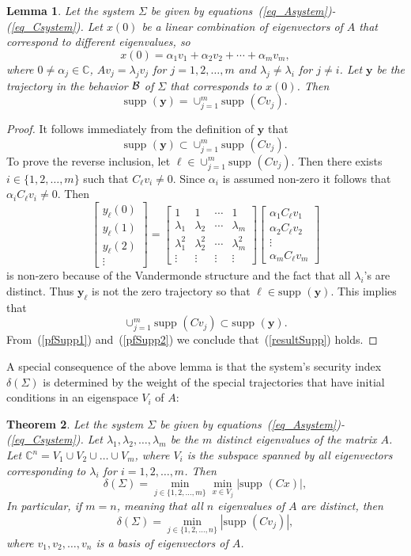 \documentclass[letterpaper, 10 pt, conference]{ieeeconf}
\newcommand{\B}{{\cal B}}
\newcommand{\supp}{\mbox{supp }}
\newcommand{\ybold}{\mathbf{y}}
\newcommand{\beq}{\begin{equation}}
\newcommand{\eeq}{\end{equation}}
\newcommand{\bmat}{\left[ \begin{array}}
\newcommand{\emat}{\end{array} \right]}
\newtheorem{thm}{Theorem}[section]
\newtheorem{lem}[thm]{Lemma}
\begin{document}
\begin{lem}\label{lemma_eigen}
Let the system $\Sigma$ be given by equations~(\ref{eq_Asystem})-(\ref{eq_Csystem}). Let $x(0)$ be a linear combination of eigenvectors of $A$ that correspond to different eigenvalues, so
\beq
x(0) = \alpha_1 v_1 + \alpha_2 v_2 + \cdots + \alpha_m v_m ,\label{eq_alphas}
\eeq
where $0 \neq \alpha_j \in {\mathbb C}$, $Av_j = \lambda_j v_j$ for $j=1,2,\ldots ,m$ and $\lambda_j\neq \lambda_i$ for $j\neq i$.
Let $\ybold$ be the trajectory in the behavior $\B$ of $\Sigma$ that corresponds to $x(0)$. Then
\beq
\supp ( \ybold ) = \cup_{j=1}^m \supp (Cv_j ) . \label{resultSupp}
\eeq
\end{lem}
\begin{proof}
It follows immediately from the definition of $\ybold$ that 
\beq
\supp ( \ybold ) \subset \cup_{j=1}^m \supp (Cv_j ) . \label{pfSupp1}
\eeq
To prove the reverse inclusion, let $\ell \in \cup_{j=1}^m \supp (Cv_j ) $. Then there exists $i \in \{1,2,\ldots , m\}$ such that $C_\ell v_i \neq 0$. Since $\alpha_i$ is assumed non-zero it follows that $\alpha_i C_\ell v_i \neq 0$. Then
\[
\bmat{c} y_\ell(0) \\ y_\ell(1) \\y_\ell(2) \\ \vdots \emat = \bmat{cccc}
1& 1 & \cdots & 1 \\
\lambda_1 & \lambda_2 & \cdots & \lambda_m \\
\lambda_1^2 & \lambda_2^2 & \cdots & \lambda_m^2 \\
\vdots & \vdots & \vdots & \vdots  \emat 
\bmat{c}
\alpha_1 C_\ell v_1 \\
\alpha_2 C_\ell v_2 \\
\vdots \\
\alpha_m C_\ell v_m \emat 
\]
is non-zero because of the Vandermonde structure and the fact that all $\lambda_i$'s  are distinct. Thus $\ybold_\ell$ is not the zero trajectory so that $\ell \in \supp(\ybold )$.
This implies that
\beq
\cup_{j=1}^m \supp (Cv_j ) \subset \supp ( \ybold ) . \label{pfSupp2}
\eeq
From~(\ref{pfSupp1}) and~(\ref{pfSupp2}) we conclude that~(\ref{resultSupp}) holds. 	
\end{proof}
A special consequence of the above lemma is that the system's security index $\delta(\Sigma)$ is determined by the weight of the special trajectories that have initial conditions in an eigenspace $V_i$ of $A$: 
\begin{thm}\label{thm_eigen}
Let the system $\Sigma$ be given by equations~(\ref{eq_Asystem})-(\ref{eq_Csystem}). Let $\lambda_1, \lambda_2 , \ldots , \lambda_m$ be the $m$ distinct eigenvalues of the matrix $A$. Let ${\mathbb C}^n = V_1 \cup  V_2 \cup \ldots \cup V_m$, where $V_i$ is the subspace spanned by all eigenvectors corresponding to $\lambda_i$ for $i=1,2,\ldots ,m$. 
Then
\[
\delta (\Sigma ) = \min_{j \in \{1,2,\ldots , m\}} \min_{x\in V_j} |\supp(Cx) |,
\]
In particular, if $m=n$, meaning that all $n$ eigenvalues of $A$ are distinct, then
\[
\delta (\Sigma ) =  \min_{j \in \{1,2,\ldots , n\}} |\supp(Cv_j)| ,
\]
where $v_1 , v_2 , \ldots , v_n$ is a basis of eigenvectors of $A$.
\end{thm}
\end{document}
